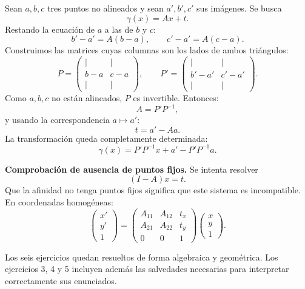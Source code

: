 Sean \(a,b,c\) tres puntos no alineados y sean \(a',b',c'\) sus imágenes. Se busca
\[
  \gamma(x)=Ax+t.
\]
Restando la ecuación de \(a\) a las de \(b\) y \(c\):
\[
  b'-a'=A(b-a),
  \qquad
  c'-a'=A(c-a).
\]
Construimos las matrices cuyas columnas son los lados de ambos triángulos:
\[
  P=
  \begin{pmatrix}\vert&\vert\\b-a&c-a\\\vert&\vert\end{pmatrix},
  \qquad
  P'=
  \begin{pmatrix}\vert&\vert\\b'-a'&c'-a'\\\vert&\vert\end{pmatrix}.
\]
Como \(a,b,c\) no están alineados, \(P\) es invertible. Entonces:
\[
  \boxed{A=P'P^{-1}},
\]
y usando la correspondencia \(a\mapsto a'\):
\[
  \boxed{t=a'-Aa}.
\]
La transformación queda completamente determinada:
\[
  \boxed{\gamma(x)=P'P^{-1}x+a'-P'P^{-1}a}.
\]

\textbf{Comprobación de ausencia de puntos fijos.} Se intenta resolver
\[
  (I-A)x=t.
\]
Que la afinidad no tenga puntos fijos significa que este sistema es incompatible. En
coordenadas homogéneas:
\[
\begin{pmatrix}x'\\y'\\1\end{pmatrix}
=
\begin{pmatrix}
A_{11}&A_{12}&t_x\\
A_{21}&A_{22}&t_y\\
0&0&1
\end{pmatrix}
\begin{pmatrix}x\\y\\1\end{pmatrix}.
\]

\begin{resultado}
Los seis ejercicios quedan resueltos de forma algebraica y geométrica. Los ejercicios 3, 4
y 5 incluyen además las salvedades necesarias para interpretar correctamente sus enunciados.
\end{resultado}

